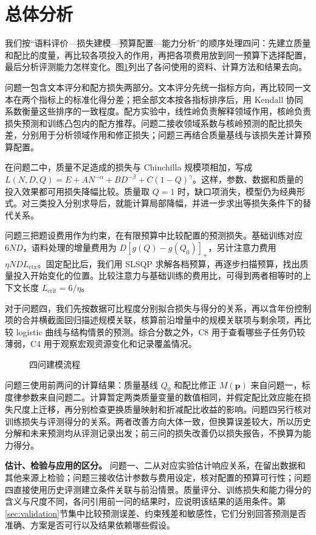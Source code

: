 \section{总体分析}

我们按“语料评价—损失建模—预算配置—能力分析”的顺序处理四问：先建立质量和配比的度量，再比较各项投入的作用，再把各项费用放到同一预算下选择配置，最后分析评测能力怎样变化。图\ref{fig:overall_architecture}列出了各问使用的资料、计算方法和结果去向。

问题一包含文本评分和配方损失两部分。文本评分先统一指标方向，再比较同一文本在两个指标上的标准化得分差；把全部文本按各指标排序后，用 Kendall 协同系数衡量这些排序的一致程度。配方实验中，线性岭负责解释领域作用，核岭负责损失预测和训练凸包内的配方推荐。问题二接收领域系数与核岭预测的配比损失差，分别用于分析领域作用和修正损失；问题三再结合质量基线与该损失差计算预算配置。

在问题二中，质量不足造成的损失与 Chinchilla 规模项相加，写成 $L(N,D,Q)=E+AN^{-\alpha}+BD^{-\beta}+C(1-Q)^{\gamma}$。这样，参数、数据和质量的投入效果都可用损失降幅比较。质量取 $Q=1$ 时，缺口项消失，模型仍为经典形式。对三类投入分别求导后，就能计算局部降幅，并进一步求出等损失条件下的替代关系。

问题三把题设费用作为约束，在有限预算中比较配置的预测损失。基础训练对应 $6ND$，语料处理的增量费用为 $D[g(Q)-g(Q_0)]_+$，另计注意力费用 $\eta NDL_{\text{ctx}}$。固定配比后，我们用 SLSQP 求解各档预算，再逐步扫描预算，找出质量投入开始变化的位置。比较注意力与基础训练的费用比，可得到两者相等时的上下文长度 $L_{\text{crit}}=6/\eta$。

对于问题四，我们先按数据可比程度分别拟合损失与得分的关系，再以含年份控制项的合并横截面回归描述规模关联，核算前沿增量中的规模关联项与剩余项，再比较 logistic 曲线与结构情景的预测。综合分数之外，C8 用于查看哪些子任务仍较薄弱，C4 用于观察宏观资源变化和记录覆盖情况。

\begin{figure}[H]
  \centering
  
  \caption{四问建模流程}
  \label{fig:overall_architecture}
\end{figure}

问题三使用前两问的计算结果：质量基线 $Q_0$ 和配比修正 $M(\bm p)$ 来自问题一，标度律参数来自问题二。计算暂定两类质量变量的数值相同，并假定配比效应能在损失尺度上迁移，再分别检查更换质量映射和折减配比收益的影响。问题四另行核对训练损失与评测得分的关系。两者改善方向大体一致，但换算误差较大，所以历史分解和未来预测均从评测记录出发；前三问的损失改善仍以损失报告，不换算为能力得分。

\textbf{估计、检验与应用的区分。} 问题一、二从对应实验估计响应关系，在留出数据和其他来源上检验；问题三接收估计参数与费用设定，核对配置的预算可行性；问题四直接使用历史评测建立条件关联与前沿情景。质量评分、训练损失和能力得分的含义与尺度不同，各问引用前一问的结果时，应说明该结果的适用条件。第\ref{sec:validation}节集中比较预测误差、约束残差和敏感性，它们分别回答预测是否准确、方案是否可行以及结果依赖哪些假设。
